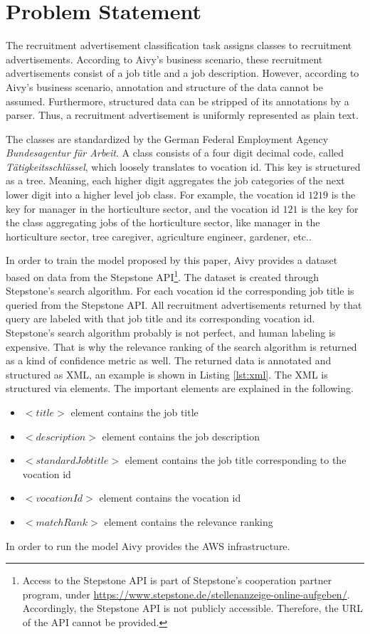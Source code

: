\section{Problem Statement}
\label{sec:problem}
The recruitment advertisement classification task assigns classes to recruitment advertisements. According to Aivy's business scenario, these recruitment advertisements consist of a job title and a job description. However, according to Aivy's business scenario, annotation and structure of the data cannot be assumed. Furthermore, structured data can be stripped of its annotations by a parser. Thus, a recruitment advertisement is uniformly represented as plain text. 
\par
The classes are standardized by the German Federal Employment Agency \textit{Bundesagentur für Arbeit}. A class consists of a four digit decimal code, called \textit{Tätigkeitsschlüssel}, which loosely translates to vocation id. This key is structured as a tree. Meaning, each higher digit aggregates the job categories of the next lower digit into a higher level job class. For example, the vocation id $1219$ is the key for manager in the horticulture sector, and the vocation id $121$ is the key for the class aggregating jobs of the horticulture sector, like manager in the horticulture sector, tree caregiver, agriculture engineer, gardener, etc..\autocite{BundesagenturfurArbeit.2010} 
\par
In order to train the model proposed by this paper, Aivy provides a dataset based on data from the Stepstone \ac{API}\footnote{Access to the Stepstone \ac{API} is part of Stepstone's cooperation partner program, under \url{https://www.stepstone.de/stellenanzeige-online-aufgeben/}. Accordingly, the Stepstone \ac{API} is not publicly accessible. Therefore, the URL of the \ac{API} cannot be provided.}. The dataset is created through Stepstone's search algorithm. For each vocation id the corresponding job title is queried from the Stepstone \ac{API}. All recruitment advertisements returned by that query are labeled with that job title and its corresponding vocation id. Stepstone's search algorithm probably is not perfect, and human labeling is expensive. That is why the relevance ranking of the search algorithm is returned as a kind of confidence metric as well. The returned data is annotated and structured as XML, an example is shown in Listing \ref{lst:xml}. The XML is structured via elements. The important elements are explained in the following.
\begin{itemize}
	\item $<title>$ element contains the job title
	\item $<description>$ element contains the job description
	\item $<standardJobtitle>$ element contains the job title corresponding to the vocation id
	\item $<vocationId>$ element contains the vocation id
	\item $<matchRank>$ element contains the relevance ranking
\end{itemize}
\par
In order to run the model Aivy provides the \ac{AWS} infrastructure.

